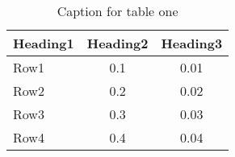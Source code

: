 \begin{table}[H]
\centering
\caption{Caption for table one}
\label{tab:table1}
\begin{tabular}{@{}lcc@{}}
\toprule
\textbf{Heading1} & \textbf{Heading2} & \textbf{Heading3} \\ \midrule
Row1 & 0.1 & 0.01 \\
Row2 & 0.2 & 0.02 \\
Row3 & 0.3 & 0.03 \\
Row4 & 0.4 & 0.04 \\ \bottomrule
\end{tabular}
\end{table}